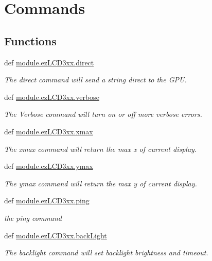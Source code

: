 \hypertarget{group___general}{\section{Commands}
\label{dd/d0a/group___general}
}
\subsection*{Functions}
\begin{DoxyCompactItemize}
\item 
def \hyperlink{group___general_gaae4c9fde1cb31e9eeb914f81698c6c92}{module.\-ez\-L\-C\-D3xx.\-direct}
\begin{DoxyCompactList}\small\item\em The direct command will send a string direct to the G\-P\-U. \end{DoxyCompactList}\item 
def \hyperlink{group___general_ga350c2e1be0d3d074d79d7a7278c44a22}{module.\-ez\-L\-C\-D3xx.\-verbose}
\begin{DoxyCompactList}\small\item\em The Verbose command will turn on or off more verbose errors. \end{DoxyCompactList}\item 
def \hyperlink{group___general_ga594f839f4d44b15ece850c795ec8e7ba}{module.\-ez\-L\-C\-D3xx.\-xmax}
\begin{DoxyCompactList}\small\item\em The xmax command will return the max x of current display. \end{DoxyCompactList}\item 
def \hyperlink{group___general_gae8e395513eeb5519612f3e988a059106}{module.\-ez\-L\-C\-D3xx.\-ymax}
\begin{DoxyCompactList}\small\item\em The ymax command will return the max y of current display. \end{DoxyCompactList}\item 
def \hyperlink{group___general_ga123be6aba6fc316922b71e3fe1bc7aaf}{module.\-ez\-L\-C\-D3xx.\-ping}
\begin{DoxyCompactList}\small\item\em the ping command \end{DoxyCompactList}\item 
def \hyperlink{group___general_ga6205864c6ae16c5fbce932315573c550}{module.\-ez\-L\-C\-D3xx.\-back\-Light}
\begin{DoxyCompactList}\small\item\em The backlight command will set backlight brightness and timeout. \end{DoxyCompactList}\item 

\end{DoxyCompactItemize}
